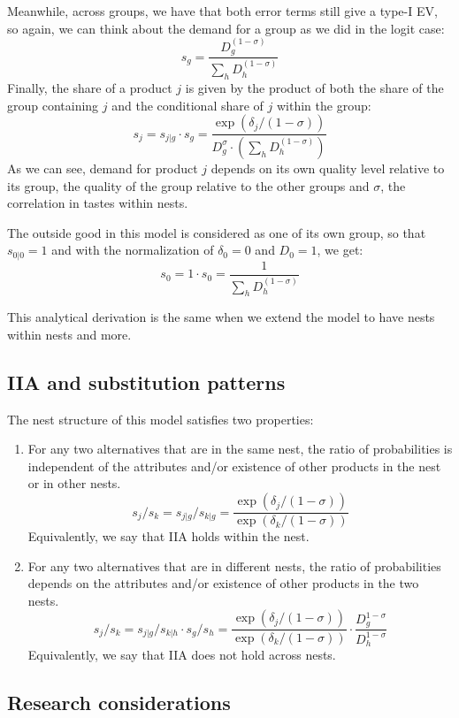 \documentclass[12pt]{report}
\begin{document}
Meanwhile, across groups, we have that both error terms still give a type-I EV, so again, we can think about the demand for a group as we did in the logit case: $$s_g = \frac{D_g^{(1-\sigma)}}{\sum_{h} D_h^{(1-\sigma)}} $$ Finally, the share of a product $j$ is given by the product of both the share of the group containing $j$ and the conditional share of $j$ within the group: $$s_j = s_{j\vert g} \cdot s_g = \frac{\exp(\delta_j/(1-\sigma))}{D_g^\sigma\cdot\left(\sum_{h} D_h^{(1-\sigma)}\right)} $$ As we can see, demand for product $j$ depends on its own quality level relative to its group, the quality of the group relative to the other groups and $\sigma$, the correlation in tastes within nests.

The outside good in this model is considered as one of its own group, so that $s_{0\vert 0} = 1$ and with the normalization of $\delta_0 = 0$ and $D_0 = 1$, we get:$$s_{0} = 1\cdot s_0 = \frac{1}{\sum_h D_h^{(1-\sigma)}} $$

This analytical derivation is the same when we extend the model to have nests within nests and more.

\subsection{IIA and substitution patterns}

The nest structure of this model satisfies two properties:\begin{enumerate}

\item For any two alternatives that are in the same nest, the ratio of probabilities is independent of the attributes and/or existence of other products in the nest or in other nests. $$ s_j / s_k = s_{j\vert g} / s_{k\vert g} = \frac{\exp(\delta_j/(1-\sigma))}{\exp(\delta_k/(1-\sigma))} $$ Equivalently, we say that IIA holds within the nest.

\item For any two alternatives that are in different nests, the ratio of probabilities depends on the attributes and/or existence of other products in the two nests. $$ s_j / s_k = s_{j\vert g} / s_{k\vert h} \cdot s_g / s_h  = \frac{\exp(\delta_j/(1-\sigma))}{\exp(\delta_k/(1-\sigma))} \cdot \frac{D_g^{1-\sigma}}{D_h^{1-\sigma}} $$ Equivalently, we say that IIA does not hold across nests.
\end{enumerate}

\subsection{Research considerations}
\end{document}
